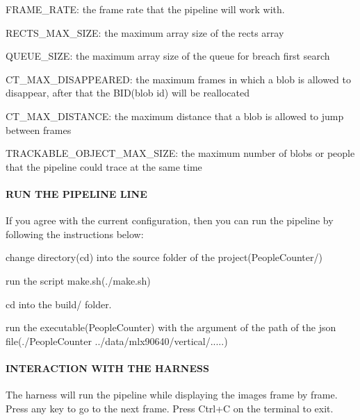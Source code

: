 \begin{DoxyItemize}
\begin{DoxyItemize}
\item F\+R\+A\+M\+E\+\_\+\+R\+A\+TE\+: the frame rate that the pipeline will work with.
\item R\+E\+C\+T\+S\+\_\+\+M\+A\+X\+\_\+\+S\+I\+ZE\+: the maximum array size of the rects array
\item Q\+U\+E\+U\+E\+\_\+\+S\+I\+ZE\+: the maximum array size of the queue for breach first search
\item C\+T\+\_\+\+M\+A\+X\+\_\+\+D\+I\+S\+A\+P\+P\+E\+A\+R\+ED\+: the maximum frames in which a blob is allowed to disappear, after that the B\+I\+D(blob id) will be reallocated
\item C\+T\+\_\+\+M\+A\+X\+\_\+\+D\+I\+S\+T\+A\+N\+CE\+: the maximum distance that a blob is allowed to jump between frames
\item T\+R\+A\+C\+K\+A\+B\+L\+E\+\_\+\+O\+B\+J\+E\+C\+T\+\_\+\+M\+A\+X\+\_\+\+S\+I\+ZE\+: the maximum number of blobs or people that the pipeline could trace at the same time
\end{DoxyItemize}
\end{DoxyItemize}

\paragraph*{R\+UN T\+HE P\+I\+P\+E\+L\+I\+NE L\+I\+NE}

If you agree with the current configuration, then you can run the pipeline by following the instructions below\+:
\begin{DoxyEnumerate}
\item change directory(cd) into the source folder of the project(People\+Counter/)
\item run the script make.\+sh(./make.sh)
\item cd into the build/ folder.
\item run the executable(\+People\+Counter) with the argument of the path of the json file(./\+People\+Counter ../data/mlx90640/vertical/.....)
\end{DoxyEnumerate}

\paragraph*{I\+N\+T\+E\+R\+A\+C\+T\+I\+ON W\+I\+TH T\+HE H\+A\+R\+N\+E\+SS}

The harness will run the pipeline while displaying the images frame by frame. Press any key to go to the next frame. Press Ctrl+C on the terminal to exit.

